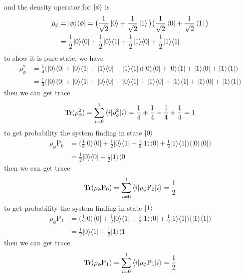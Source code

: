 \documentclass{article}
\newcommand{\op}[2]{|#1\rangle \langle#2|}
\newcommand{\sand}[3]{\braket{#1 | #2 | #3}}
\begin{document}
and the density operator for $\ket{\phi}$ is
\begin{align*}
    \rho_{\phi} &= \op{\phi}{\phi} = \big(\frac{1}{\sqrt{2}}\ket{0} + \frac{1}{\sqrt{2}}\ket{1}\big)\big(\frac{1}{\sqrt{2}}\bra{0} + \frac{1}{\sqrt{2}}\bra{1}\big) \\
    &= \frac{1}{2}\op{0}{0} + \frac{1}{2}\op{0}{1} + \frac{1}{2}\op{1}{0} + \frac{1}{2}\op{1}{1}
\end{align*}
to show it is pure state, we have
\begin{align*}
    \rho^2_{\phi} &= \frac{1}{4}\big(\op{0}{0} + \op{0}{1} + \op{1}{0} + \op{1}{1}\big)\big(\op{0}{0} + \op{0}{1} + \op{1}{0} + \op{1}{1}\big) \\
    &= \frac{1}{4}\big( \op{0}{0} + \op{0}{1} + \op{0}{0} + \op{0}{1} + \op{1}{0} + \op{1}{1} + \op{1}{0} + \op{1}{1} \big)
\end{align*}
then we can get trace 
\begin{align*}
    \text{Tr}(\rho^2_{\phi}) = \sum_{i=0}^{1} \sand{i}{\rho^2_{\phi}}{i} = \frac{1}{4} + \frac{1}{4} + \frac{1}{4} + \frac{1}{4} = 1
\end{align*}
to get probability the system finding in state $\ket{0}$
\begin{align*}
    \rho_{\phi}\text{P}_{0} &= \big(\frac{1}{2}\op{0}{0} + \frac{1}{2}\op{0}{1} + \frac{1}{2}\op{1}{0} + \frac{1}{2}\op{1}{1}\big)\big(\op{0}{0}\big) \\
    &= \frac{1}{2}\op{0}{0} + \frac{1}{2}\op{1}{0}
\end{align*}
then we can get trace 
\begin{align*}
    \text{Tr}(\rho_{\phi}\text{P}_{0}) = \sum_{i=0}^{1} \sand{i}{\rho_{\phi}\text{P}_{0}}{i} = \frac{1}{2}
\end{align*}
to get probability the system finding in state $\ket{1}$
\begin{align*}
    \rho_{\phi}\text{P}_{1} &= \big(\frac{1}{2}\op{0}{0} + \frac{1}{2}\op{0}{1} + \frac{1}{2}\op{1}{0} + \frac{1}{2}\op{1}{1}\big)\big(\op{1}{1}\big) \\
    &= \frac{1}{2}\op{0}{1} + \frac{1}{2}\op{1}{1}
\end{align*}
then we can get trace 
\begin{align*}
    \text{Tr}(\rho_{\phi}\text{P}_{1}) = \sum_{i=0}^{1} \sand{i}{\rho_{\phi}\text{P}_{1}}{i} = \frac{1}{2}
\end{align*}
\end{document}
